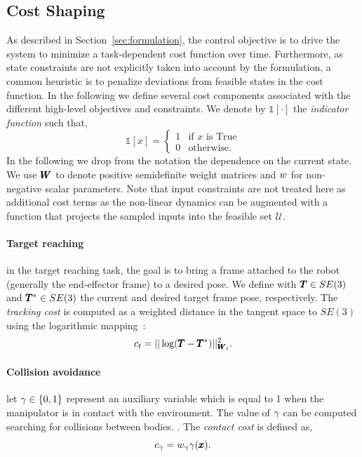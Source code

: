 \subsection{Cost Shaping}
As described in Section~\ref{sec:formulation}, the control objective is to drive the system to minimize a task-dependent cost function over time. Furthermore, as state constraints are not explicitly taken into account by the formulation, a common heuristic is to penalize deviations from feasible states in the cost function. In the following we define several cost components associated with the different high-level objectives and constraints.
We denote by $\mathds{1}[\cdot]$ the \textit{indicator function} such that,
\begin{equation}
    \mathds{1}[x] = 
    \begin{cases}
    1 & \text{if } x \text{ is True} \\
    0 & \text{otherwise}.
    \end{cases}
\end{equation}
In the following we drop from the notation the dependence on the current state. We use $\pmb{W}_{}$ to denote positive semidefinite weight matrices and $w_{}$ for non-negative scalar parameters. Note that input constraints are not treated here as additional cost terms as the non-linear dynamics can be augmented with a function that projects the sampled inputs into the feasible set $\mathcal{U}$.

\paragraph{Target reaching} in the target reaching task, the goal is to bring a frame attached to the robot (generally the end-effector frame) to a desired pose. We define with $\pmb{T} \in SE(3)$ and $\pmb{T}^* \in SE(3)$ the current and desired target frame pose, respectively. The \textit{tracking cost} is computed as a weighted distance in the tangent space to $SE(3)$ using the logarithmic mapping~\cite{blanco2010tutorial}:
\begin{equation} \label{eq:tracking_cost}
     c_{t} = || \log(\pmb{T} - \pmb{T}^{*}) ||^2_{\pmb{W}_{t}}.
 \end{equation}
 
 \paragraph{Collision avoidance} let $\gamma \in \{0, 1\}$ represent an auxiliary variable which is equal to 1 when the manipulator is in contact with the environment. The value of $\gamma$ can be computed searching for collisions between bodies. 
 . 
 The \textit{contact cost} is defined as,
 \begin{equation}
     c_{\gamma}= w_{\gamma} \gamma(\pmb{x}).
 \end{equation}

